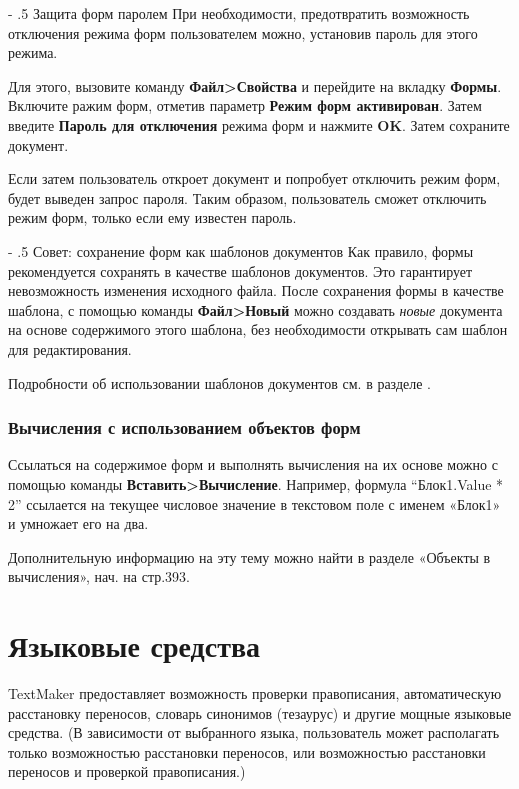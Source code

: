 ﻿\documentclass[a4paper,10pt]{article}
\makeatletter
\renewcommand\paragraph{%
   \@startsection{paragraph}{4}{0mm}%
      {-\baselineskip}%
      {.5\baselineskip}%
      {\normalfont\normalsize\bfseries}}
\makeatother
\begin{document}
\paragraph{Защита форм паролем}
При необходимости, предотвратить возможность отключения режима форм пользователем можно, установив пароль для этого режима.

Для этого, вызовите команду \textbf{Файл>Свойства} и перейдите на вкладку \textbf{Формы}. Включите ражим форм, отметив параметр \textbf{Режим форм активирован}. Затем введите \textbf{Пароль для отключения} режима форм и нажмите \textbf{OK}. Затем сохраните документ.

Если затем пользователь откроет документ и попробует отключить режим форм, будет выведен запрос пароля. Таким образом, пользователь сможет отключить режим форм, только если ему известен пароль.

\paragraph{Совет: сохранение форм как шаблонов документов}
Как правило, формы рекомендуется сохранять в качестве шаблонов документов. Это гарантирует невозможность изменения исходного файла. После сохранения формы в качестве шаблона, с помощью команды \textbf{Файл>Новый} можно создавать \textit{новые} документа на основе содержимого этого шаблона, без необходимости открывать сам шаблон для редактирования.

Подробности об использовании шаблонов документов см. в разделе .

\subsubsection{Вычисления с использованием объектов форм}
Ссылаться на содержимое форм и выполнять вычисления на их основе можно с помощью команды \textbf{Вставить>Вычисление}. Например, формула “Блок1.Value * 2” ссылается на текущее числовое значение в текстовом поле с именем «Блок1» и умножает его на два.

Дополнительную информацию на эту тему можно найти в разделе «Объекты в вычисления», нач. на стр.393.

\section{Языковые средства} \label{sec:языксредства}
TextMaker предоставляет возможность проверки правописания, автоматическую расстановку переносов, словарь синонимов (тезаурус) и другие мощные языковые средства. (В зависимости от выбранного языка, пользователь может располагать только возможностью расстановки переносов, или возможностью расстановки переносов и проверкой правописания.)
\end{document}
